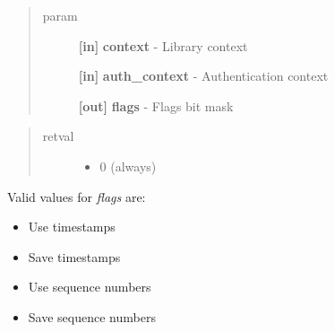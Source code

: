 \documentclass[letterpaper,10pt,english]{sphinxmanual}
\begin{document}
\begin{fulllineitems}
\label{appdev/refs/api/krb5_auth_con_getflags:c.krb5_auth_con_getflags}
\end{fulllineitems}

\begin{quote}\begin{description}
\item[{param}] \leavevmode
\textbf{{[}in{]}} \textbf{context} - Library context

\textbf{{[}in{]}} \textbf{auth\_context} - Authentication context

\textbf{{[}out{]}} \textbf{flags} - Flags bit mask

\end{description}\end{quote}
\begin{quote}\begin{description}
\item[{retval}] \leavevmode\begin{itemize}
\item {} 
0   (always)

\end{itemize}

\end{description}\end{quote}

Valid values for \emph{flags} are:
\begin{itemize}
\item {} 
{\hyperref[appdev/refs/macros/KRB5_AUTH_CONTEXT_DO_TIME:KRB5_AUTH_CONTEXT_DO_TIME]{}} Use timestamps

\item {} 
{\hyperref[appdev/refs/macros/KRB5_AUTH_CONTEXT_RET_TIME:KRB5_AUTH_CONTEXT_RET_TIME]{}} Save timestamps

\item {} 
{\hyperref[appdev/refs/macros/KRB5_AUTH_CONTEXT_DO_SEQUENCE:KRB5_AUTH_CONTEXT_DO_SEQUENCE]{}} Use sequence numbers

\item {} 
{\hyperref[appdev/refs/macros/KRB5_AUTH_CONTEXT_RET_SEQUENCE:KRB5_AUTH_CONTEXT_RET_SEQUENCE]{}} Save sequence numbers

\end{itemize}
\end{document}
